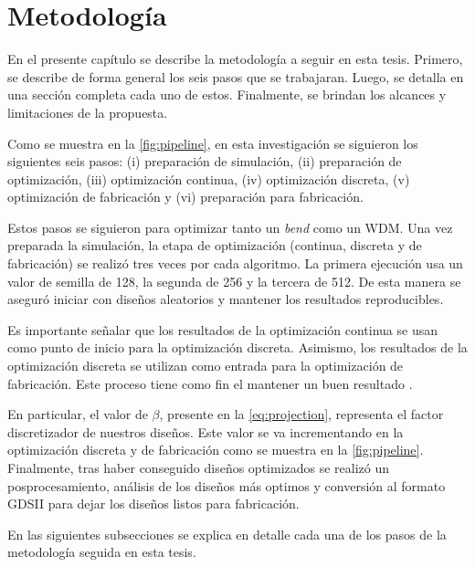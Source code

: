 \chapter{Metodología}\label{chapter:methodology}

En el presente capítulo se describe la metodología a seguir en esta tesis.
Primero, se describe de forma general los seis pasos que se trabajaran.
Luego, se detalla en una sección completa cada uno de estos.
Finalmente, se brindan los alcances y limitaciones de la propuesta.

Como se muestra en la \autoref{fig:pipeline}, en esta investigación se siguieron los siguientes seis pasos:
(i) preparación de simulación, 
(ii) preparación de optimización, 
(iii) optimización continua,
(iv) optimización discreta,
(v) optimización de fabricación y
(vi) preparación para fabricación.

Estos pasos se siguieron para optimizar tanto un \emph{bend} como un WDM.
Una vez preparada la simulación, la etapa de optimización (continua, discreta y de fabricación) se realizó
tres veces por cada algoritmo.
La primera ejecución usa un valor de semilla de 128, la segunda de 256 y la tercera de 512.
De esta manera se aseguró iniciar con diseños aleatorios y mantener los resultados reproducibles.

Es importante señalar que los resultados de la optimización continua se usan como punto de inicio
para la optimización discreta. Asimismo, los resultados de la optimización discreta se utilizan como
entrada para la optimización de fabricación.
Este proceso tiene como fin el mantener un buen resultado \citep{Yang2017}.


En particular, el valor de $\beta$, presente en la \autoref{eq:projection}, representa el factor discretizador de nuestros diseños.
Este valor se va incrementando en la optimización discreta y de fabricación como se muestra en la
\autoref{fig:pipeline}.
Finalmente, tras haber conseguido diseños optimizados se realizó un posprocesamiento,
análisis de los diseños más optimos y conversión al formato GDSII para dejar los diseños 
listos para fabricación.

En las siguientes subsecciones se explica en detalle cada una de los pasos de la metodología seguida en esta tesis.

